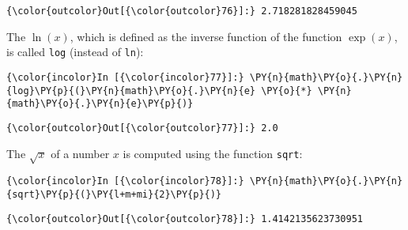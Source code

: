 \begin{Verbatim}[commandchars=\\\{\}]
{\color{outcolor}Out[{\color{outcolor}76}]:} 2.718281828459045
\end{Verbatim}
The  \(\ln(x)\), which is defined as the inverse function of the function \(\exp(x)\), is called \texttt{log} (instead of \texttt{ln}):
\begin{Verbatim}[commandchars=\\\{\}]
{\color{incolor}In [{\color{incolor}77}]:} \PY{n}{math}\PY{o}{.}\PY{n}{log}\PY{p}{(}\PY{n}{math}\PY{o}{.}\PY{n}{e} \PY{o}{*} \PY{n}{math}\PY{o}{.}\PY{n}{e}\PY{p}{)}
\end{Verbatim}

\begin{Verbatim}[commandchars=\\\{\}]
{\color{outcolor}Out[{\color{outcolor}77}]:} 2.0
\end{Verbatim}
The  \(\sqrt{x}\) of a number \(x\) is computed using the
function \texttt{sqrt}:
\begin{Verbatim}[commandchars=\\\{\}]
{\color{incolor}In [{\color{incolor}78}]:} \PY{n}{math}\PY{o}{.}\PY{n}{sqrt}\PY{p}{(}\PY{l+m+mi}{2}\PY{p}{)}
\end{Verbatim}

\begin{Verbatim}[commandchars=\\\{\}]
{\color{outcolor}Out[{\color{outcolor}78}]:} 1.4142135623730951
\end{Verbatim}


